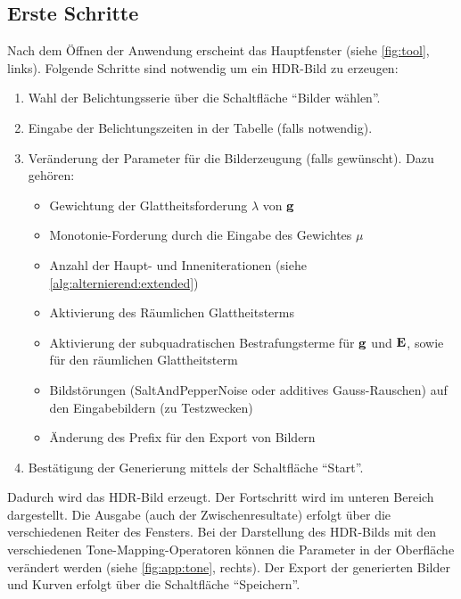 \subsection{Erste Schritte}
Nach dem Öffnen der Anwendung erscheint das Hauptfenster (siehe \autoref{fig:tool}, links). Folgende Schritte sind notwendig um ein \gls{HDR}-Bild zu erzeugen:

\begin{enumerate}
    \item Wahl der Belichtungsserie über die Schaltfläche \enquote{Bilder wählen}.
    \item Eingabe der Belichtungszeiten in der Tabelle (falls notwendig).
    \item Veränderung der Parameter für die Bilderzeugung (falls gewünscht). Dazu gehören:
    \begin{itemize}
        \item Gewichtung der Glattheitsforderung $\lambda$ von $\mathbf g$
        \item Monotonie-Forderung durch die Eingabe des Gewichtes $\mu$
        \item Anzahl der Haupt- und Inneniterationen (siehe \autoref{alg:alternierend:extended})
        \item Aktivierung des Räumlichen Glattheitsterms 
        \item Aktivierung der subquadratischen Bestrafungsterme für $\mathbf g$ und $\mathbf E$, sowie für den räumlichen Glattheitsterm
        \item Bildstörungen (\gls{SaltAndPepperNoise} oder additives Gauss-Rauschen) auf den Eingabebildern (zu Testzwecken)
        \item Änderung des Prefix für den Export von Bildern
    \end{itemize}

    \item Bestätigung der Generierung mittels der Schaltfläche \enquote{Start}.
\end{enumerate}

Dadurch wird das \gls{HDR}-Bild erzeugt. Der Fortschritt wird im unteren Bereich dargestellt. Die Ausgabe (auch der Zwischenresultate) erfolgt über die verschiedenen Reiter des Fensters. Bei der Darstellung des \gls{HDR}-Bilds mit den verschiedenen \gls{Tone-Mapping}-Operatoren können die Parameter in der Oberfläche verändert werden (siehe \autoref{fig:app:tone}, rechts). Der Export der generierten Bilder und Kurven erfolgt über die Schaltfläche \enquote{Speichern}.


